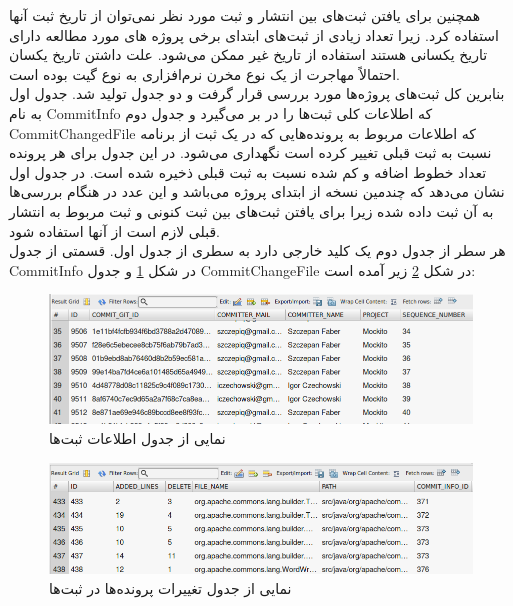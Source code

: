 همچنین برای یافتن ثبت‌های بین انتشار و ثبت مورد نظر نمی‌توان از تاریخ ثبت آنها استفاده کرد. زیرا تعداد زیادی از ثبت‌های ابتدای  برخی پروژه ‌های مورد مطالعه دارای تاریخ یکسانی هستند استفاده از تاریخ غیر ممکن می‌شود. علت داشتن تاریخ یکسان احتمالاً مهاجرت از یک نوع مخرن نرم‌افزاری به نوع گیت بوده است. \\

 بنابرین کل ثبت‌های پروژه‌ها مورد بررسی قرار گرفت و دو جدول تولید شد.
جدول اول به نام CommitInfo‌ که اطلاعات کلی ثبت‌ها را در بر می‌گیرد و جدول دوم  CommitChangedFile که اطلاعات مربوط به پرونده‌هایی که در یک ثبت از برنامه نسبت به ثبت قبلی تغییر کرده است نگهداری می‌شود.  در این جدول برای هر پرونده تعداد خطوط اضافه و کم شده نسبت به ثبت قبلی ذخیره شده است. در جدول اول  نشان می‌دهد که چندمین نسخه از ابتدای پروژه می‌باشد و این عدد در هنگام بررسی‌ها به آن ثبت داده‌ شده زیرا برای یافتن ثبت‌های بین ثبت کنونی و ثبت مربوط به انتشار قبلی لازم است از آنها استفاده شود. \\
  هر سطر از جدول دوم یک کلید خارجی دارد به سطری از جدول اول. قسمتی از جدول CommitInfo  در شکل \ref{fig:commit-info} و جدول CommitChangeFile در شکل \ref{fig:change-file-info}  زیر آمده است:

\begin{figure}[H]
	\centering
	\includegraphics[width=1\textwidth]{img/case_study/commit-info.png}
	\caption{نمایی از جدول اطلاعات ثبت‌ها}
	\label{fig:commit-info}
\end{figure}


\begin{figure}[H]
	\centering
	\includegraphics[width=1\textwidth]{img/case_study/change-file-info.png}
	\caption{ نمایی از جدول تغییرات پرونده‌ها در ثبت‌ها }
	\label{fig:change-file-info}
\end{figure}

